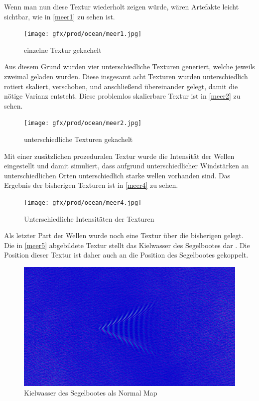 Wenn man nun diese Textur wiederholt zeigen würde, wären Artefakte leicht sichtbar, wie in \autoref{meer1} zu sehen ist.

\begin{figure}[H]
\texttt{[image: gfx/prod/ocean/meer1.jpg]}
\caption{einzelne Textur gekachelt}
\label{meer1}
\end{figure}

Aus diesem Grund wurden vier unterschiedliche Texturen generiert, welche jeweils zweimal geladen wurden. Diese insgesamt acht Texturen wurden unterschiedlich rotiert skaliert, verschoben, und anschließend übereinander gelegt, damit die nötige Varianz entsteht. Diese problemlos skalierbare Textur ist in \autoref{meer2} zu sehen.

\begin{figure}[H]
\texttt{[image: gfx/prod/ocean/meer2.jpg]}
\caption{unterschiedliche Texturen gekachelt}
\label{meer2}
\end{figure}

Mit einer zusätzlichen prozeduralen Textur wurde die Intensität der Wellen eingestellt und damit simuliert, dass aufgrund unterschiedlicher Windstärken an unterschiedlichen Orten unterschiedlich starke wellen vorhanden sind. Das Ergebnis der bisherigen Texturen ist in \autoref{meer4} zu sehen.


\begin{figure}[H]
\texttt{[image: gfx/prod/ocean/meer4.jpg]}
\caption{Unterschiedliche Intensitäten der Texturen}
\label{meer4}
\end{figure}

Als letzter Part der Wellen wurde noch eine Textur über die bisherigen gelegt. Die in \autoref{meer5} abgebildete Textur stellt das Kielwasser des Segelbootes dar \cite{Wake}. Die Position dieser Textur ist daher auch an die Position des Segelbootes gekoppelt.

\begin{figure}[H]
\includegraphics[width=\textwidth]{gfx/prod/ocean/meer5.jpg}
\caption{Kielwasser des Segelbootes als Normal Map}
\label{meer5}
\end{figure}

